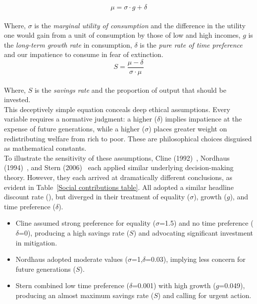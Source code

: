 \documentclass[12pt, oneside]{article}   	%
\begin{document}
\begin{equation}
\mu = \sigma \cdot g + \delta
\end{equation}\\

Where, $\sigma$ is the \emph{marginal utility of consumption} and the difference in the utility one would gain from a unit of consumption by those of low and high incomes, $g$ is the \emph{long-term growth rate} in consumption, $\delta$ is the \emph{pure rate of time preference} and our impatience to consume in fear of extinction.\\

\begin{equation}
S = \frac{\mu-\delta}{\sigma \cdot \mu}
\end{equation}\\

Where, $S$ is the \emph{savings rate} and the proportion of output that should be invested.\\

This deceptively simple equation conceals deep ethical assumptions.
Every variable requires a normative judgment: a higher ($\delta$) implies impatience at the expense of future generations, while a higher ($\sigma$) places greater weight on redistributing welfare from rich to poor.
These are philosophical choices disguised as mathematical constants.\\

To illustrate the sensitivity of these assumptions, Cline (1992)~\cite{wc1}, Nordhaus (1994)~\cite{wn1}, and Stern (2006)~\cite{ns1} each applied similar underlying decision-making theory.
However, they each arrived at dramatically different conclusions, as evident in Table~\ref{Social contributions table}.
All adopted a similar headline discount rate (), but diverged in their treatment of equality ($\sigma$), growth ($g$), and time preference ($\delta$).\\

\begin{itemize}
	\item Cline assumed strong preference for equality ($\sigma$=1.5) and no time preference ($\delta$=0), producing a high savings rate ($S$) and advocating significant investment in mitigation.
	\item Nordhaus adopted moderate values ($\sigma$=1,$\delta$=0.03), implying less concern for future generations ($S$).
	\item Stern combined low time preference ($\delta$=0.001) with high growth ($g$=0.049), producing an almost maximum savings rate ($S$) and calling for urgent action.
\end{itemize}
\end{document}
